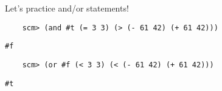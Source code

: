\begin{blocksection}
Let's practice and/or statements!

\begin{lstlisting}
    scm> (and #t (= 3 3) (> (- 61 42) (+ 61 42)))
\end{lstlisting}
\begin{solution}[.25in]
    \texttt{\#f}
\end{solution}

\begin{lstlisting}
    scm> (or #f (< 3 3) (< (- 61 42) (+ 61 42)))
\end{lstlisting}
\begin{solution}[.25in]
    \texttt{\#t}
\end{solution}
\end{blocksection}